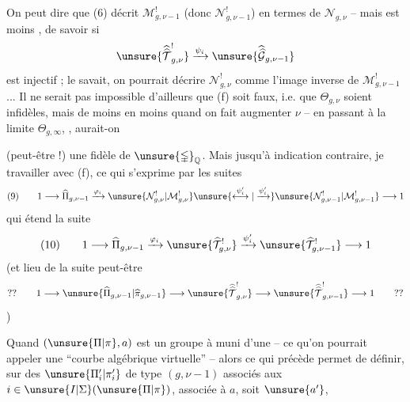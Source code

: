 On peut dire que (6) décrit $\mathcal M_{g,\nu-1}^{!}$ (donc $\mathcal N_{g,\nu-1}^{!}$) en termes de $\mathcal N_{g,\nu}$ -- mais  est moins ,  de savoir si
\[
\unsure{\widehat{\widehat{\mathcal T}}_{g,\nu}^{!}}
\xrightarrow{\psi_i}
\unsure{\widehat{\widehat{\mathcal G}}_{g,\nu-1}}
\]
est injectif ;  le savait, on pourrait décrire $\mathcal N_{g,\nu}^{!}$ comme l'image inverse de $\mathcal M_{g,\nu-1}^{!}$ ...  Il ne serait pas impossible d'ailleurs que (f) soit faux, i.e. que  $\Theta_{g,\nu}$ soient infidèles, mais de moins en moins quand on fait augmenter $\nu$ -- en passant à la limite  $\Theta_{g,\infty}$, , aurait-on


(peut-être !) une  fidèle de $\unsure{\mathbb{\Gamma}}_{\mathbb Q}$. Mais jusqu'à indication contraire, je  travailler  avec (f), ce qui s'exprime par les suites  
\[
(9)\qquad
1\longrightarrow\widehat{\Pi}_{g,\nu-1}
\xrightarrow{\varphi_i}
\unsure{\mathcal N_{g,\nu}^{!}|\mathcal M_{g,\nu}^{!}}
\unsure{\overset{\psi_i'}{\longleftrightarrow}|\xrightarrow{\psi_i'}}
\unsure{\mathcal N_{g,\nu-1}^{!}|\mathcal M_{g,\nu-1}^{!}}
\longrightarrow1
\]
qui étend la suite 
\[
(10)\qquad
1\longrightarrow\widehat{\Pi}_{g,\nu-1}
\xrightarrow{\varphi_i}
\unsure{\widehat{\mathcal T}_{g,\nu}^{!}}
\xrightarrow{\psi_i'}
\unsure{\widehat{\mathcal T}_{g,\nu-1}^{!}}
\longrightarrow1
\]
(et  lieu de la suite  peut-être 
\[
??\qquad
1\longrightarrow\unsure{\widehat{\Pi}_{g,\nu-1}|\widehat{\pi}_{g,\nu-1}}
\longrightarrow\unsure{\widehat{\widehat{\mathcal T}}_{g,\nu}^{!}}
\longrightarrow\unsure{\widehat{\widehat{\mathcal T}}_{g,\nu-1}^{!}}
\longrightarrow1
\qquad??
\]
)

Quand $(\unsure{\Pi|\pi},a)$ est un groupe  à  muni d'une  -- ce qu'on pourrait appeler une ``courbe algébrique virtuelle'' -- alors ce qui précède permet de définir, sur  des $\unsure{\Pi_i'|\pi_i'}$ de type $(g,\nu-1)$ associés aux $i\in\unsure{I|\Sigma}(\unsure{\Pi|\pi})$,    associée à $a$, soit $\unsure{a'}$,

